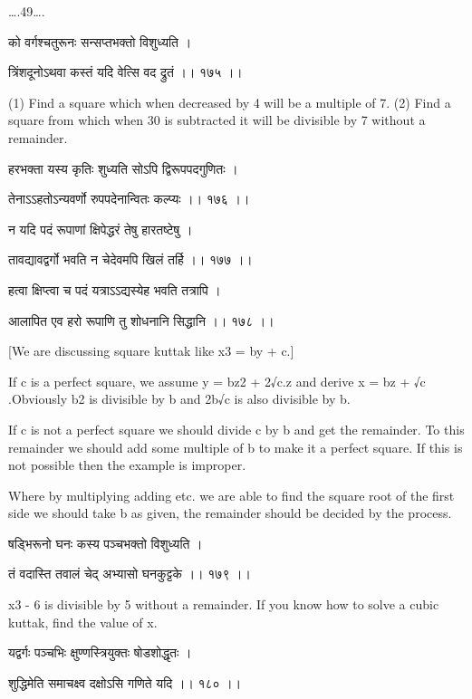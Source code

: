 \documentclass[]{article}
\date{}
\begin{document}
{\ldots{}.49\ldots{}.}

{को वर्गश्चतुरूनः सन्सप्तभक्तो विशुध्यति । }

{त्रिंशदूनोऽथवा कस्तं यदि वेत्सि वद द्रुतं ।। १७५ ।। }

{(1) Find a square which when decreased by 4 will be a multiple of 7.
(2) Find a square from which when 30 is subtracted it will be divisible
by 7 without a remainder.}

{हरभक्ता यस्य कृतिः शुध्यति सोऽपि द्विरूपपदगुणितः । }

{तेनाऽऽहतोऽन्यवर्णो रुपपदेनान्वितः कल्प्यः ।। १७६ ।। }

{न यदि पदं रूपाणां क्षिपेद्धरं तेषु हारतष्टेषु । }

{तावद्यावद्वर्गो भवति न चेदेवमपि खिलं तर्हि ।। १७७ ।। }

{हत्वा क्षिप्त्वा च पदं यत्राऽऽद्यस्येह भवति तत्रापि । }

{आलापित एव हरो रूपाणि तु शोधनानि सिद्धानि ।। १७८ ।। }

{{[}We are discussing square kuttak like x}{3}{ = by + c.{]}}

{If c is a perfect square, we assume y = bz}{2}{ + 2}{√}{c.z and derive
x = bz + }{√}{c .Obviously b2 is divisible by b and 2b}{√}{c is }{also
divisible by b.}

{If c is not a perfect square we should divide c by b and get the
remainder. To this remainder we should add some multiple of b to make it
a perfect square. If this is not possible then the example is improper.}

{Where by multiplying adding etc. we are able to find the square root of
the first side we should take b as given, the remainder should be
decided by the process.}

{षड्भिरूनो घनः कस्य पञ्चभक्तो विशुध्यति । }

{तं वदास्ति तवालं चेद् अभ्यासो घनकुट्टके ।। १७९ ।। }

{x}{3}{ - 6 is divisible by 5 without a remainder. If you know how to
solve a cubic kuttak, find the value of x.}

{यद्वर्गः पञ्चभिः क्षुण्णस्त्रियुक्तः षोडशोद्धृतः । }

{शुद्धिमेति समाचक्ष्व दक्षोऽसि गणिते यदि ।। १८० ।।}{\\
}
\end{document}
